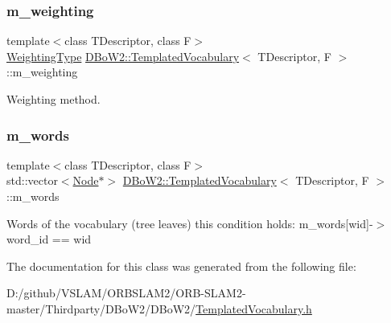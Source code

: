 \subsubsection{\texorpdfstring{m\+\_\+weighting}{m\_weighting}}
{\footnotesize\ttfamily template$<$class T\+Descriptor, class F$>$ \\
\mbox{\hyperlink{namespace_d_bo_w2_a5de5c8a307aca9a84ffefda2a9bc467a}{Weighting\+Type}} \mbox{\hyperlink{class_d_bo_w2_1_1_templated_vocabulary}{D\+Bo\+W2\+::\+Templated\+Vocabulary}}$<$ T\+Descriptor, F $>$\+::m\+\_\+weighting\hspace{0.3cm}{\ttfamily [protected]}}



Weighting method. 

\mbox{\label{class_d_bo_w2_1_1_templated_vocabulary_a1665546b54f954d2d54d59a6982df3ca}} 
\subsubsection{\texorpdfstring{m\+\_\+words}{m\_words}}
{\footnotesize\ttfamily template$<$class T\+Descriptor, class F$>$ \\
std\+::vector$<$\mbox{\hyperlink{struct_d_bo_w2_1_1_templated_vocabulary_1_1_node}{Node}}$\ast$$>$ \mbox{\hyperlink{class_d_bo_w2_1_1_templated_vocabulary}{D\+Bo\+W2\+::\+Templated\+Vocabulary}}$<$ T\+Descriptor, F $>$\+::m\+\_\+words\hspace{0.3cm}{\ttfamily [protected]}}

Words of the vocabulary (tree leaves) this condition holds\+: m\+\_\+words\mbox{[}wid\mbox{]}-\/$>$word\+\_\+id == wid 

The documentation for this class was generated from the following file\+:\begin{DoxyCompactItemize}
\item 
D\+:/github/\+V\+S\+L\+A\+M/\+O\+R\+B\+S\+L\+A\+M2/\+O\+R\+B-\/\+S\+L\+A\+M2-\/master/\+Thirdparty/\+D\+Bo\+W2/\+D\+Bo\+W2/\mbox{\hyperlink{_templated_vocabulary_8h}{Templated\+Vocabulary.\+h}}\end{DoxyCompactItemize}
